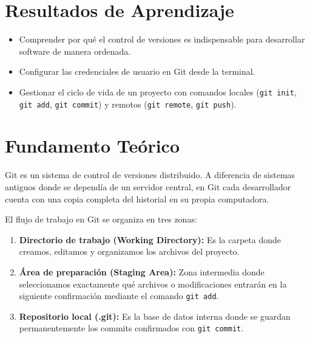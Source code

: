 \documentclass[11pt,a4paper]{article}
\begin{document}
\section{Resultados de Aprendizaje}
\begin{itemize}[leftmargin=1.5cm]
    \item Comprender por qué el control de versiones es indispensable para desarrollar software de manera ordenada.
    \item Configurar las credenciales de usuario en Git desde la terminal.
    \item Gestionar el ciclo de vida de un proyecto con comandos locales (\texttt{git init}, \texttt{git add}, \texttt{git commit}) y remotos (\texttt{git remote}, \texttt{git push}).
\end{itemize}

\section{Fundamento Teórico}
Git es un sistema de control de versiones distribuido. A diferencia de sistemas antiguos donde se dependía de un servidor central, en Git cada desarrollador cuenta con una copia completa del historial en su propia computadora.

El flujo de trabajo en Git se organiza en tres zonas:
\begin{enumerate}
    \item \textbf{Directorio de trabajo (Working Directory):} Es la carpeta donde creamos, editamos y organizamos los archivos del proyecto.
    \item \textbf{Área de preparación (Staging Area):} Zona intermedia donde seleccionamos exactamente qué archivos o modificaciones entrarán en la siguiente confirmación mediante el comando \texttt{git add}.
    \item \textbf{Repositorio local (.git):} Es la base de datos interna donde se guardan permanentemente los commits confirmados con \texttt{git commit}.
\end{enumerate}

\end{document}
